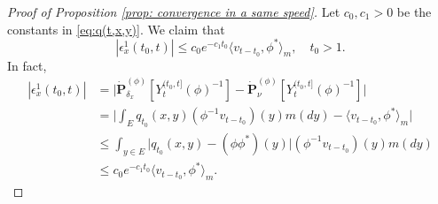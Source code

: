 \documentclass[12pt, a4paper]{amsart}
\theoremstyle{definition}
\numberwithin{equation}{section}
\begin{document}
\begin{proof}[Proof of Proposition \ref{prop: convergence in a same speed}]
	Let  $c_0, c_1>0$ be the constants in \eqref{eq:q(t,x,y)}.
	We claim that
\[\label{eq: bound for epsilon1}
	|\epsilon_x^1(t_0,t)|
	\leq c_0 e^{-c_1 t_0}\langle v_{t-t_0},\phi^* \rangle_m,
    \quad t_0 > 1.
\]
	In fact,
\[\label{eq:epsilon-1}\begin{split}
	|\epsilon_x^1(t_0,t)|
	& = \big| \dot {\mathbf P}_{\delta_x}^{(\phi)} [Y^{(t_0,t]}_t(\phi)^{-1}] - \dot {\mathbf P}_\nu^{(\phi)} [Y^{(t_0,t]}_t(\phi)^{-1}] \big| \\
	& = \big|  \int_E  q_{t_0}(x,y)(\phi^{-1}v_{t-t_0})(y) m(dy) - \langle v_{t-t_0},\phi^* \rangle_m \big|\\
	& \leq \int_{y\in E} \big| q_{t_0}(x,y) - (\phi\phi^*)(y) \big| (\phi^{-1}v_{t-t_0})(y) m(dy)\\
	& \leq c_0 e^{-c_1 t_0}\langle v_{t-t_0},\phi^* \rangle_m .
\end{split}\]


\end{proof}
\end{document}

